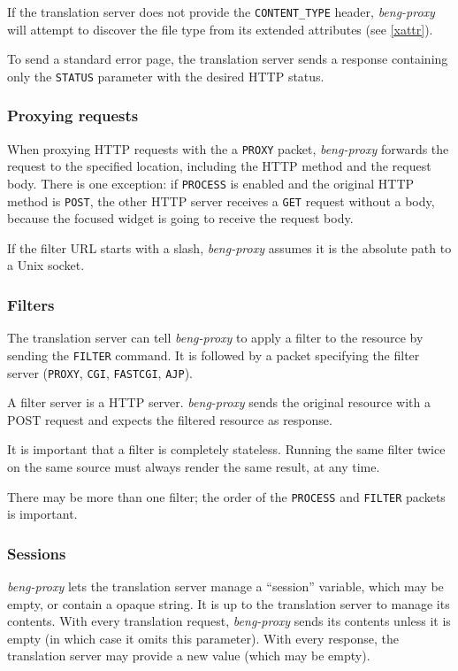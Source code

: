 \documentclass[a4paper,12pt]{article}
\begin{document}
If the translation server does not provide the \texttt{CONTENT\_TYPE}
header, \emph{beng-proxy} will attempt to discover the file type from
its extended attributes (see \ref{xattr}).

To send a standard error page, the translation server sends a response
containing only the \texttt{STATUS} parameter with the desired HTTP
status.

\subsubsection{Proxying requests}

When proxying HTTP requests with the a \texttt{PROXY} packet,
\emph{beng-proxy} forwards the request to the specified location,
including the HTTP method and the request body.  There is one
exception: if \texttt{PROCESS} is enabled and the original HTTP method
is \texttt{POST}, the other HTTP server receives a \texttt{GET}
request without a body, because the focused widget is going to receive
the request body.

If the filter URL starts with a slash, \emph{beng-proxy} assumes it is
the absolute path to a Unix socket.

\subsubsection{Filters}
\label{filter}

The translation server can tell \emph{beng-proxy} to apply a filter to
the resource by sending the \texttt{FILTER} command.  It is followed
by a packet specifying the filter server (\texttt{PROXY},
\texttt{CGI}, \texttt{FASTCGI}, \texttt{AJP}).

A filter server is a HTTP server.  \emph{beng-proxy} sends the
original resource with a POST request and expects the filtered
resource as response.

It is important that a filter is completely stateless.  Running the
same filter twice on the same source must always render the same
result, at any time.

There may be more than one filter; the order of the \texttt{PROCESS}
and \texttt{FILTER} packets is important.

\subsubsection{Sessions}
\label{sessions}

\emph{beng-proxy} lets the translation server manage a ``session''
variable, which may be empty, or contain a opaque string.  It is up to
the translation server to manage its contents.  With every translation
request, \emph{beng-proxy} sends its contents unless it is empty (in
which case it omits this parameter).  With every response, the
translation server may provide a new value (which may be empty).
\end{document}
